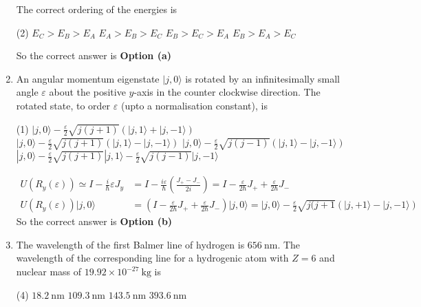 \begin{enumerate}
The correct ordering of the energies is
 \begin{tasks}(2)
	\task[\textbf{a.}] $E_{C}>E_{B}>E_{A}$
	\task[\textbf{b.}]$E_{A}>E_{B}>E_{C}$
	\task[\textbf{c.}]$E_{B}>E_{C}>E_{A}$
	\task[\textbf{d.}] $E_{B}>E_{A}>E_{C}$
\end{tasks}
\begin{answer}
	So the correct answer is \textbf{Option (a)}
\end{answer}
\item  An angular momentum eigenstate $|j, 0\rangle$ is rotated by an infinitesimally small angle $\varepsilon$ about the positive $y$-axis in the counter clockwise direction. The rotated state, to order $\varepsilon$ (upto a normalisation constant), is
 \begin{tasks}(1)
	\task[\textbf{a.}]$|j, 0\rangle-\frac{\varepsilon}{2} \sqrt{j(j+1)}(|j, 1\rangle+|j,-1\rangle)$
	\task[\textbf{b.}] $|j, 0\rangle-\frac{\varepsilon}{2} \sqrt{j(j+1)}(|j, 1\rangle-|j,-1\rangle)$
	\task[\textbf{c.}]$|j, 0\rangle-\frac{\varepsilon}{2} \sqrt{j(j-1)}(|j, 1\rangle-|j,-1\rangle)$
	\task[\textbf{d.}] $|j, 0\rangle-\frac{\varepsilon}{2} \sqrt{j(j+1)}|j, 1\rangle-\frac{\varepsilon}{2} \sqrt{j(j-1)}|j,-1\rangle$	
\end{tasks}
\begin{answer}
	\begin{align*}
	U\left(R_{y}(\varepsilon)\right) \simeq I-\frac{i}{\hbar} \varepsilon J_{y}&=I-\frac{i \varepsilon}{\hbar}\left(\frac{J_{+}-J_{-}}{2 i}\right)=I-\frac{\varepsilon}{2 \hbar} J_{+}+\frac{\varepsilon}{2 \hbar} J_{-}\\
	U\left(R_{y}(\varepsilon)\right)|j, 0\rangle&=\left(I-\frac{\varepsilon}{2 \hbar} J_{+}+\frac{\varepsilon}{2 \hbar} J_{-}\right)|j, 0\rangle=|j, 0\rangle-\frac{\varepsilon}{2} \sqrt{j(j+1}(|j,+1\rangle-|j,-1\rangle)
	\end{align*}
		So the correct answer is \textbf{Option (b)}
\end{answer}
\item  The wavelength of the first Balmer line of hydrogen is $656 \mathrm{~nm}$. The wavelength of the corresponding line for a hydrogenic atom with $Z=6$ and nuclear mass of $19.92 \times 10^{-27} \mathrm{~kg}$ is
 \begin{tasks}(4)
	\task[\textbf{a.}] $18.2 \mathrm{~nm}$
	\task[\textbf{b.}]$109.3 \mathrm{~nm}$
	\task[\textbf{c.}]$143.5 \mathrm{~nm}$
	\task[\textbf{d.}]  $393.6 \mathrm{~nm}$
\end{tasks}	
\begin{answer}

\end{answer}
\end{enumerate}
